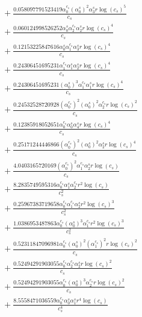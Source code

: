 \documentclass[10pt]{article}
\begin{document}
\begin{align*}
&{}  + \frac{0.058097791523419 \alpha_{0}^{c_s} \left(\alpha_{0}^s\right)^{2} \alpha_{3}^s r \log{\left(c_{s} \right)}^{5}}{c_{s}} \\
&{}  + \frac{0.060124998526252 \alpha_{0}^s \alpha_{2}^{c_s} \alpha_{2}^s r \log{\left(c_{s} \right)}^{4}}{c_{s}} \\
&{}  + \frac{0.12153225847616 \alpha_{0}^s \alpha_{1}^{c_s} \alpha_{3}^s r \log{\left(c_{s} \right)}^{4}}{c_{s}} \\
&{}  + \frac{0.24306451695231 \alpha_{1}^{c_s} \alpha_{1}^s \alpha_{2}^s r \log{\left(c_{s} \right)}^{4}}{c_{s}} \\
&{}  + \frac{0.24306451695231 \left(\alpha_{0}^s\right)^{3} \alpha_{1}^{c_s} \alpha_{1}^s r \log{\left(c_{s} \right)}^{4}}{c_{s}} \\
&{}  + \frac{0.24532528720928 \left(\alpha_{0}^{c_s}\right)^{2} \left(\alpha_{0}^s\right)^{2} \alpha_{2}^{c_s} r \log{\left(c_{s} \right)}^{2}}{c_{s}} \\
&{}  + \frac{0.12385918052651 \alpha_{0}^{c_s} \alpha_{0}^s \alpha_{4}^s r \log{\left(c_{s} \right)}^{4}}{c_{s}} \\
&{}  + \frac{0.25171244446866 \left(\alpha_{0}^{c_s}\right)^{2} \left(\alpha_{0}^s\right)^{2} \alpha_{2}^s r \log{\left(c_{s} \right)}^{4}}{c_{s}} \\
&{}  + \frac{4.0403165720169 \left(\alpha_{0}^{c_s}\right)^{2} \alpha_{1}^{c_s} \alpha_{2}^s r \log{\left(c_{s} \right)}}{c_{s}} \\
&{}  + \frac{8.2835749595316 \alpha_{0}^{c_s} \alpha_{1}^s \alpha_{2}^{c_s} r^{2} \log{\left(c_{s} \right)}}{c_{s}^{2}} \\
&{}  + \frac{0.25967383719658 \alpha_{0}^{c_s} \alpha_{1}^{c_s} \alpha_{2}^s r^{2} \log{\left(c_{s} \right)}^{3}}{c_{s}^{2}} \\
&{}  + \frac{1.0386953487863 \alpha_{0}^{c_s} \left(\alpha_{0}^s\right)^{3} \alpha_{1}^{c_s} r^{2} \log{\left(c_{s} \right)}^{3}}{c_{s}^{2}} \\
&{}  + \frac{0.52311847096981 \alpha_{0}^{c_s} \left(\alpha_{0}^s\right)^{2} \left(\alpha_{1}^{c_s}\right)^{2} r \log{\left(c_{s} \right)}^{2}}{c_{s}} \\
&{}  + \frac{0.52494291903055 \alpha_{0}^{c_s} \alpha_{2}^{c_s} \alpha_{2}^s r \log{\left(c_{s} \right)}^{2}}{c_{s}} \\
&{}  + \frac{0.52494291903055 \alpha_{0}^{c_s} \left(\alpha_{0}^s\right)^{3} \alpha_{2}^{c_s} r \log{\left(c_{s} \right)}^{2}}{c_{s}} \\
&{}  + \frac{8.5558471036559 \alpha_{0}^{c_s} \alpha_{0}^s \alpha_{1}^s r^{4} \log{\left(c_{s} \right)}}{c_{s}^{4}} \\

\end{align*}
\end{document}
